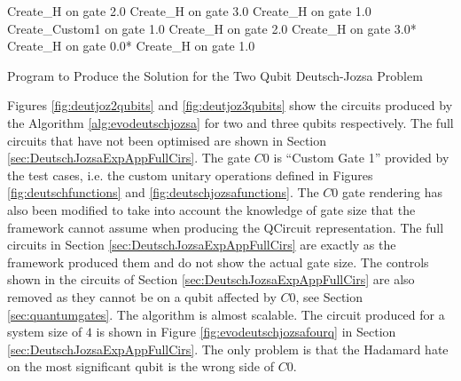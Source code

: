 \begin{algorithm}
 \begin{algorithmic}
\STATE Create\_H on gate 2.0
\STATE Create\_H on gate 3.0
\STATE Create\_H on gate 1.0
\STATE Create\_Custom1 on gate 1.0
\STATE Create\_H on gate 2.0
\STATE Create\_H on gate 3.0*
\STATE Create\_H on gate 0.0*
\STATE Create\_H on gate 1.0
 \end{algorithmic}
\caption{Program to Produce the Solution for the Two Qubit Deutsch-Jozsa Problem}
\label{alg:deutjozsatwoqubits}
\end{algorithm}


Figures \ref{fig:deutjoz2qubits} and \ref{fig:deutjoz3qubits} show the circuits produced by the Algorithm \ref{alg:evodeutschjozsa} for two and three qubits respectively.
The full circuits that have not been optimised are shown in Section \ref{sec:DeutschJozsaExpAppFullCirs}.
The gate $C0$ is ``Custom Gate 1'' provided by the test cases, i.e. the custom unitary operations defined in Figures \ref{fig:deutschfunctions} and \ref{fig:deutschjozsafunctions}.
The $C0$ gate rendering has also been modified to take into account the knowledge of gate size that the framework cannot assume when producing the QCircuit representation.
The full circuits in Section \ref{sec:DeutschJozsaExpAppFullCirs} are exactly as the framework produced them and do not show the actual gate size.
The controls shown in the circuits of Section \ref{sec:DeutschJozsaExpAppFullCirs} are also removed as they cannot be on a qubit affected by $C0$, see Section \ref{sec:quantumgates}.
The algorithm is almost scalable.
The circuit produced for a system size of $4$ is shown in Figure \ref{fig:evodeutschjozsafourq} in Section \ref{sec:DeutschJozsaExpAppFullCirs}.
The only problem is that the Hadamard hate on the most significant qubit is the wrong side of $C0$.


